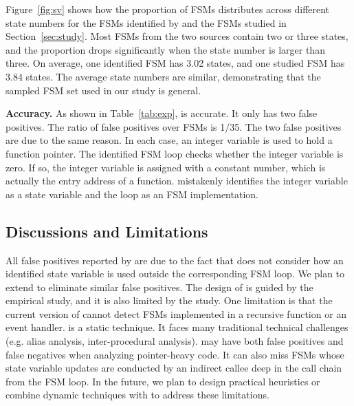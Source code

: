 Figure~\ref{fig:sv} shows how the proportion of FSMs distributes 
across different state numbers for the FSMs identified by \Tool{} 
and the FSMs studied in Section~\ref{sec:study}. 
Most FSMs from the two sources contain two or three states, 
and the proportion drops significantly when the state number is larger than three. 
On average, one identified FSM has 3.02 states, 
and one studied FSM has 3.84 states. 
The average state numbers are similar,
demonstrating that the sampled FSM set used in our study is general. 




\noindent\textbf{Accuracy.}
As shown in Table~\ref{tab:exp}, \Tool{} is accurate.
It only has two false positives.
The ratio of false positives over FSMs is 1/35.
The two false positives are due to the same reason.
In each case, an integer variable is used to hold a function pointer.
The identified FSM loop checks whether the integer variable is zero. %
If so, the integer variable is assigned with a constant number,
which is actually the entry address of a function.
\Tool{} mistakenly identifies the integer variable as a state variable 
and the loop as an FSM implementation.



\subsection{Discussions and Limitations}

All false positives reported by \Tool{} are due to the fact that 
\Tool{} does not consider how an identified state variable is used outside 
the corresponding FSM loop. 
We plan to extend \Tool{} to eliminate similar false positives. 
The design of \Tool{} is guided by the empirical study, and it is also limited by the study. 
One limitation is that the current version of \Tool{} cannot detect FSMs implemented 
in a recursive function or an event handler. 
\Tool{} is a static technique. 
It faces many traditional technical challenges (e.g. alias analysis, inter-procedural analysis).
\Tool{} may have both false positives and false negatives when analyzing 
pointer-heavy code. 
It can also miss FSMs whose state variable updates are conducted 
by an indirect callee deep in the call chain from the FSM loop. 
In the future, we plan to design practical 
heuristics or combine dynamic techniques with \Tool{} to address these limitations. 
  
 


